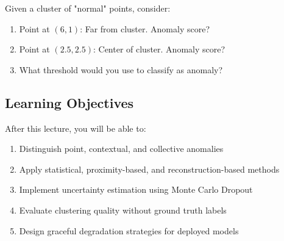 \begin{marginfigure}
\caption{Which points are anomalies? On what basis?}
\end{marginfigure}

Given a cluster of "normal" points, consider:
\begin{enumerate}
    \item Point at $(6, 1)$: Far from cluster. Anomaly score?
    \item Point at $(2.5, 2.5)$: Center of cluster. Anomaly score?
    \item What threshold would you use to classify as anomaly?
\end{enumerate}

\subsection{Learning Objectives}

After this lecture, you will be able to:
\begin{enumerate}
    \item Distinguish point, contextual, and collective anomalies
    \item Apply statistical, proximity-based, and reconstruction-based methods
    \item Implement uncertainty estimation using Monte Carlo Dropout
    \item Evaluate clustering quality without ground truth labels
    \item Design graceful degradation strategies for deployed models
\end{enumerate}

